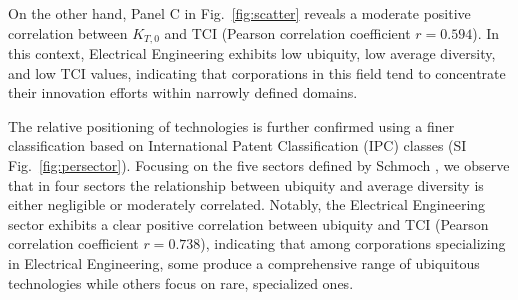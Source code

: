 On the other hand, Panel C in Fig.~\ref{fig:scatter} reveals a moderate positive correlation between $K_{T,0}$ and TCI (Pearson correlation coefficient $r=0.594$). 
In this context, Electrical Engineering exhibits low ubiquity, low average diversity, and low TCI values, indicating that corporations in this field tend to concentrate their innovation efforts within narrowly defined domains.

The relative positioning of technologies is further confirmed using a finer classification based on International Patent Classification (IPC) classes (SI Fig.~\ref{fig:persector}). 
Focusing on the five sectors defined by Schmoch \cite{Schmoch2008}, we observe that in four sectors the relationship between ubiquity and average diversity is either negligible or moderately correlated. Notably, the Electrical Engineering sector exhibits a clear positive correlation between ubiquity and TCI (Pearson correlation coefficient $r=0.738$), indicating that among corporations specializing in Electrical Engineering, some produce a comprehensive range of ubiquitous technologies while others focus on rare, specialized ones.

